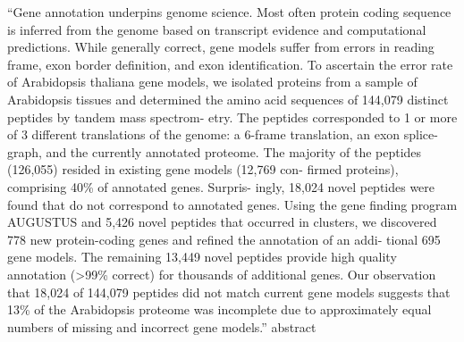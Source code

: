     ``Gene annotation underpins genome science. Most often protein coding
    sequence is inferred from the genome based on transcript evidence and
    computational predictions. While generally correct, gene models suffer from
    errors in reading frame, exon border definition, and exon identification.
    To ascertain the error rate of Arabidopsis thaliana gene models, we
    isolated proteins from a sample of Arabidopsis tissues and determined the
    amino acid sequences of 144,079 distinct peptides by tandem mass spectrom-
    etry. The peptides corresponded to 1 or more of 3 different translations of
    the genome: a 6-frame translation, an exon splice- graph, and the currently
    annotated proteome. The majority of the peptides (126,055) resided in
    existing gene models (12,769 con- firmed proteins), comprising 40\% of
    annotated genes. Surpris- ingly, 18,024 novel peptides were found that do
    not correspond to annotated genes. Using the gene finding program AUGUSTUS
    and 5,426 novel peptides that occurred in clusters, we discovered 778 new
    protein-coding genes and refined the annotation of an addi- tional 695 gene
    models. The remaining 13,449 novel peptides provide high quality annotation
    (>99\% correct) for thousands of additional genes. Our observation that
    18,024 of 144,079 peptides did not match current gene models suggests that
    13\% of the Arabidopsis proteome was incomplete due to approximately equal
    numbers of missing and incorrect gene models.'' abstract

